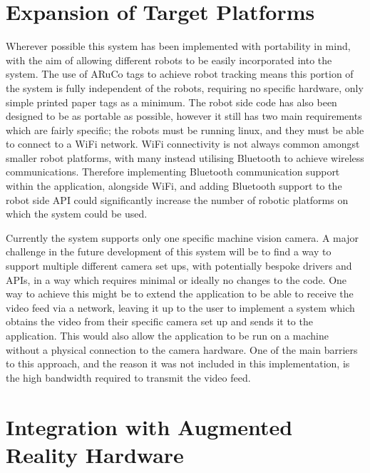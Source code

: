 
\section{Expansion of Target Platforms}

Wherever possible this system has been implemented with portability in mind, with the aim of allowing different robots to be easily incorporated into the system. The use of ARuCo tags to achieve robot tracking means this portion of the system is fully independent of the robots, requiring no specific hardware, only simple printed paper tags as a minimum. The robot side code has also been designed to be as portable as possible, however it still has two main requirements which are fairly specific; the robots must be running linux, and they must be able to connect to a WiFi network. WiFi connectivity is not always common amongst smaller robot platforms, with many instead utilising Bluetooth to achieve wireless communications. Therefore implementing Bluetooth communication support within the application, alongside WiFi, and adding Bluetooth support to the robot side API could significantly increase the number of robotic platforms on which the system could be used.

Currently the system supports only one specific machine vision camera. A major challenge in the future development of this system will be to find a way to support multiple different camera set ups, with potentially bespoke drivers and APIs, in a way which requires minimal or ideally no changes to the code. One way to achieve this might be to extend the application to be able to receive the video feed via a network, leaving it up to the user to implement a system which obtains the video from their specific camera set up and sends it to the application. This would also allow the application to be run on a machine without a physical connection to the camera hardware. One of the main barriers to this approach, and the reason it was not included in this implementation, is the high bandwidth required to transmit the video feed.


\section{Integration with Augmented Reality Hardware}


